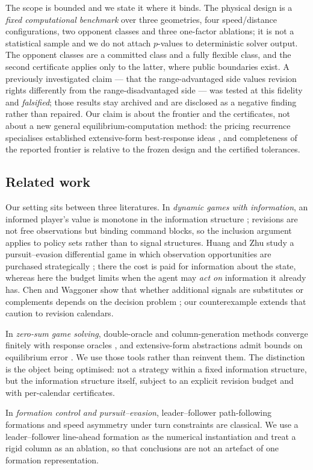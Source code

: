 The scope is bounded and we state it where it binds. The physical design is a
\emph{fixed computational benchmark} over three geometries, four
speed/distance configurations, two opponent classes and three one-factor
ablations; it is not a statistical sample and we do not attach $p$-values to
deterministic solver output. The opponent classes are a committed class and a
fully flexible class, and the second certificate applies only to the latter,
where public boundaries exist. A previously investigated claim --- that the
range-advantaged side values revision rights differently from the
range-disadvantaged side --- was tested at this fidelity and \emph{falsified};
those results stay archived and are disclosed as a negative finding rather
than repaired. Our claim is about the frontier and the certificates, not about
a new general equilibrium-computation method: the pricing recurrence
specialises established extensive-form best-response ideas
\citep{mcmahan2003,bosansky2014,kroer2018}, and completeness of the reported
frontier is relative to the frozen design and the certified tolerances.

\subsection{Related work}

Our setting sits between three literatures. In \emph{dynamic games with
information}, an informed player's value is monotone in the information
structure \citep{hogeboom2020}; revisions are not free observations but
binding command blocks, so the inclusion argument applies to policy sets
rather than to signal structures. Huang and Zhu study a pursuit--evasion
differential game in which observation opportunities are purchased
strategically \citep{huang2021}; there the cost is paid for information about
the state, whereas here the budget limits when the agent may \emph{act on}
information it already has. Chen and Waggoner show that whether additional
signals are substitutes or complements depends on the decision problem
\citep{chen2017}; our counterexample extends that caution to revision
calendars.

In \emph{zero-sum game solving}, double-oracle and column-generation methods
converge finitely with response oracles \citep{mcmahan2003,bosansky2014}, and
extensive-form abstractions admit bounds on equilibrium error
\citep{kroer2018}. We use those tools rather than reinvent them. The
distinction is the object being optimised: not a strategy within a fixed
information structure, but the information structure itself, subject to an
explicit revision budget and with per-calendar certificates.

In \emph{formation control and pursuit--evasion}, leader--follower
path-following formations and speed asymmetry under turn constraints are
classical. We use a leader--follower line-ahead formation as the numerical
instantiation and treat a rigid column as an ablation, so that conclusions are
not an artefact of one formation representation.
